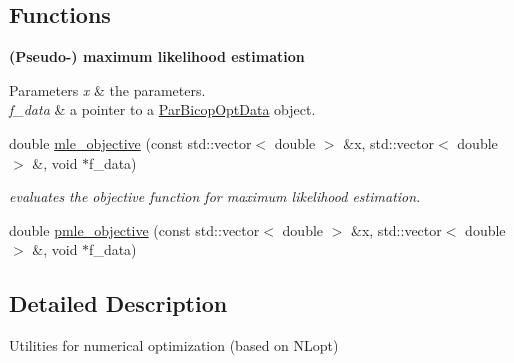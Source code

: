 \subsection*{Functions}
\begin{Indent}{\bf (Pseudo-\/) maximum likelihood estimation}\par
{\em 
\begin{DoxyParams}{Parameters}
{\em x} & the parameters. \\
\hline
{\em f\+\_\+data} & a pointer to a \hyperlink{structvinecopulib_1_1tools__optimization_1_1_par_bicop_opt_data}{Par\+Bicop\+Opt\+Data} object. \\
\hline
\end{DoxyParams}
}\begin{DoxyCompactItemize}
\item 
\hypertarget{namespacevinecopulib_1_1tools__optimization_ad3d35a53b2b9ca0f1c1ad5068eccaca7}{double \hyperlink{namespacevinecopulib_1_1tools__optimization_ad3d35a53b2b9ca0f1c1ad5068eccaca7}{mle\+\_\+objective} (const std\+::vector$<$ double $>$ \&x, std\+::vector$<$ double $>$ \&, void $\ast$f\+\_\+data)}\label{namespacevinecopulib_1_1tools__optimization_ad3d35a53b2b9ca0f1c1ad5068eccaca7}

\begin{DoxyCompactList}\small\item\em evaluates the objective function for maximum likelihood estimation. \end{DoxyCompactList}\item 
double \hyperlink{namespacevinecopulib_1_1tools__optimization_a8e87f5c5ee5463aded9dfa45e6c0d3f0}{pmle\+\_\+objective} (const std\+::vector$<$ double $>$ \&x, std\+::vector$<$ double $>$ \&, void $\ast$f\+\_\+data)
\end{DoxyCompactItemize}
\end{Indent}


\subsection{Detailed Description}
Utilities for numerical optimization (based on N\+Lopt) 

